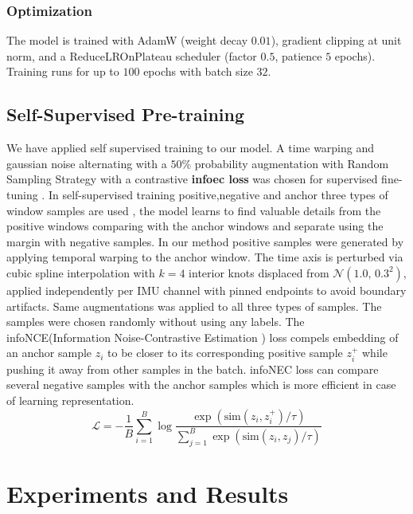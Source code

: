 \documentclass[conference]{IEEEtran}
\begin{document}
\subsubsection{Optimization}
The model is trained with AdamW (weight decay $0.01$), gradient clipping at unit norm, and a ReduceLROnPlateau scheduler (factor $0.5$, patience $5$ epochs). Training runs for up to $100$ epochs with batch size $32$.

\subsection{Self-Supervised Pre-training}
\label{sec:ssl}

We have applied self supervised training to our model. A time warping and gaussian noise alternating with a $50$\% probability augmentation with Random Sampling Strategy with a contrastive \textbf{infoec loss} was chosen for supervised fine-tuning . 
In self-supervised training positive,negative and anchor three types of window samples are used , the model learns to find valuable details from the positive windows comparing with the anchor windows and separate using the margin with negative samples.
In our method positive samples were generated by applying temporal warping to the anchor window. The time axis is perturbed via cubic spline interpolation with $k{=}4$ interior knots displaced from $\mathcal{N}(1.0,\, 0.3^2)$, applied independently per IMU channel with pinned endpoints to avoid boundary artifacts. Same augmentations was applied to all three types of samples. The samples were chosen randomly without using any labels.
The infoNCE(Information Noise-Contrastive Estimation ) loss compels embedding of an anchor sample   $z_i$  to be closer to its corresponding positive sample   $z_i^+$ while pushing it away from other samples in the batch. infoNEC loss can compare several negative samples with the anchor samples which is more efficient in case of learning representation.
\begin{equation}
\mathcal{L} = 
- \frac{1}{B} \sum_{i=1}^{B}
\log \frac{
\exp\left(\mathrm{sim}(z_i, z_i^+)/\tau\right)
}{
\sum_{j=1}^{B} \exp\left(\mathrm{sim}(z_i, z_j)/\tau\right)
}
\end{equation}


\section{Experiments and Results}
\end{document}
